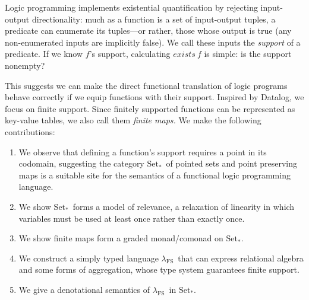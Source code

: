 \documentclass[runningheads]{llncs}
\newcommand\strong[1]{{\bfseries#1}}
\newcommand\todo[1]{{\color{IndianRed}#1}}
\newcommand\TODO[1]{\todo{\strong{TODO}: #1}}
\newcommand\xxx{\text{\todo{\strong{XXX}}}}
\newcommand\todolater\todo
\renewcommand\todolater[1]{\todo{\color{RoyalBlue}#1}}
\renewcommand\todo[1]{\ignorespaces}\renewcommand\xxx{\text{\color{IndianRed}\strong{XXX}}}
\newcommand\fslang{\ensuremath{\lambda_{\mathrm{FS}}}}
\newcommand\catname[1]{\ensuremath{\mathrm{#1}}}
\newcommand\Point{\ensuremath{\catname{Set}_{*}}}
\newcommand\name[1]{\ensuremath{\mathit{#1}}}
\newcommand\<\:                 %
\begin{document}
Logic programming implements existential quantification by rejecting input-out\-put directionality:
much as a function is a set of input-output tuples, a predicate can enumerate its tuples---or rather, those whose output is true (any non-enumerated inputs are implicitly false).
%
We call these inputs the \emph{support} of a predicate.
%
If we know $f$'s support, calculating $\name{exists}\<f$ is simple: is the support nonempty?

This suggests we can make the direct functional translation of logic programs behave correctly if we equip functions with %
their support.
%
Inspired by %
Datalog, we focus on {finite} support.
Since finitely supported functions can be represented as key-value tables, we also call them \emph{finite maps.}
\todolater{maybe I should discuss the `goal' here: a language with procedural higher order functions, but also finite maps which are guaranteed finitely supported, represented as tables, and computed like database queries. should this go after or before contribution list? I guess it's a nice pr\'ecis of \fslang.}
We make the following contributions:
%
\begin{enumerate}
\item We observe that defining a function's support requires a point in its codomain, suggesting the category \Point\ of pointed sets and point preserving maps is a suitable site for the semantics of a functional logic programming language.

\item We show \Point\ forms a model of relevance, a relaxation of linearity in which variables must be used {at least once} rather than {exactly once.}

\item We show finite maps form a graded monad/comonad on \Point.

\item We construct a simply typed language \fslang\ that can express relational algebra and some forms of aggregation, whose type system guarantees finite support.
  \todolater{but we still support nonfinite possibly higher order functions! so we handle the \emph{interaction} between finite \& nonfinite things.}

\item We give a denotational semantics of \fslang\ in \Point. \TODO{cut semantics figure and rephrase as ``\emph{sketch} a denotational semantics of \fslang\ in \Point.''?}
\end{enumerate}
\end{document}

